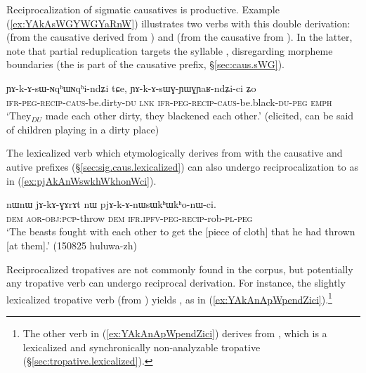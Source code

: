 Reciprocalization of sigmatic causatives is productive. Example (\ref{ex:YAkAsWGYWGYaRnW}) illustrates two verbs with this double derivation:  (from the causative   derived from ) and   (from the causative   from ). In the latter, note that partial reduplication targets the syllable , disregarding morpheme boundaries (the  is part of the causative prefix, §\ref{sec:caus.sWG}).

 \begin{exe}
\ex \label{ex:YAkAsWGYWGYaRnW}
\gll ɲɤ-k-ɤ-sɯ-ɴqʰɯ\redp{}ɴqʰi-ndʑi tɕe, ɲɤ-k-ɤ-sɯɣ-ɲɯ\redp{}ɣɲaʁ-ndʑi-ci ʑo \\
\textsc{ifr}-\textsc{peg}-\textsc{recip}-\textsc{caus}-be.dirty-\textsc{du} \textsc{lnk} \textsc{ifr}-\textsc{peg}-\textsc{recip}-\textsc{caus}-be.black-\textsc{du}-\textsc{peg} \textsc{emph} \\
\glt `They$_{DU}$ made each other dirty, they blackened each other.' (elicited, can be said of children playing in a dirty place)
\end{exe}

The lexicalized verb  which etymologically derives from  with the causative and autive prefixes (§\ref{sec:sig.caus.lexicalized}) can also undergo reciprocalization to  as in (\ref{ex:pjAkAnWswkhWkhonWci}).
 
 \begin{exe}
\ex \label{ex:pjAkAnWswkhWkhonWci}
\gll nɯnɯ jɤ-kɤ-ɣɤrɤt nɯ pjɤ-k-ɤ-nɯsɯkʰɯ\redp{}kʰo-nɯ-ci. \\
\textsc{dem} \textsc{aor}-\textsc{obj}:\textsc{pcp}-throw \textsc{dem} \textsc{ifr}.\textsc{ipfv}-\textsc{peg}-\textsc{recip}-rob-\textsc{pl}-\textsc{peg} \\
\glt `The beasts fought with each other to get the [piece of cloth] that he had thrown [at them].' (150825 huluwa-zh) 
\end{exe}

Reciprocalized tropatives are not commonly found in the corpus, but potentially any tropative verb can undergo reciprocal derivation. For instance, the slightly lexicalized tropative verb  (from ) yields , as in (\ref{ex:YAkAnApWpendZici}).\footnote{The other verb  in (\ref{ex:YAkAnApWpendZici}) derives from , which is a lexicalized and synchronically non-analyzable tropative (§\ref{sec:tropative.lexicalized}). }


